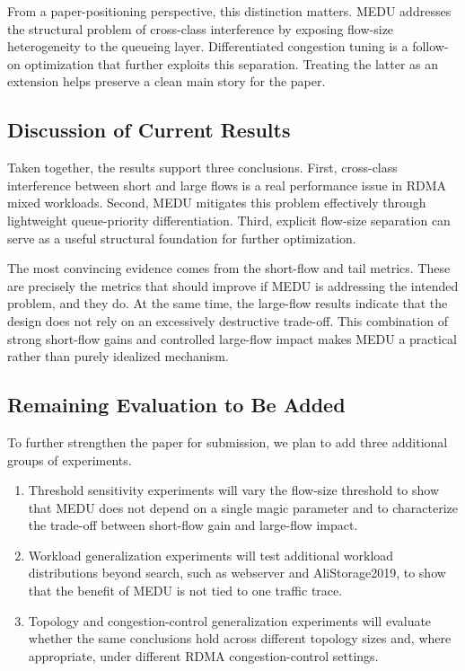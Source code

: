 \documentclass[conference]{IEEEtran}
\begin{document}
From a paper-positioning perspective, this distinction matters. MEDU addresses the structural problem of cross-class interference by exposing flow-size heterogeneity to the queueing layer. Differentiated congestion tuning is a follow-on optimization that further exploits this separation. Treating the latter as an extension helps preserve a clean main story for the paper.

\subsection{Discussion of Current Results}

Taken together, the results support three conclusions. First, cross-class interference between short and large flows is a real performance issue in RDMA mixed workloads. Second, MEDU mitigates this problem effectively through lightweight queue-priority differentiation. Third, explicit flow-size separation can serve as a useful structural foundation for further optimization.

The most convincing evidence comes from the short-flow and tail metrics. These are precisely the metrics that should improve if MEDU is addressing the intended problem, and they do. At the same time, the large-flow results indicate that the design does not rely on an excessively destructive trade-off. This combination of strong short-flow gains and controlled large-flow impact makes MEDU a practical rather than purely idealized mechanism.

\subsection{Remaining Evaluation to Be Added}

To further strengthen the paper for submission, we plan to add three additional groups of experiments.

\begin{enumerate}
  \item Threshold sensitivity experiments will vary the flow-size threshold to show that MEDU does not depend on a single magic parameter and to characterize the trade-off between short-flow gain and large-flow impact.
  \item Workload generalization experiments will test additional workload distributions beyond search, such as webserver and AliStorage2019, to show that the benefit of MEDU is not tied to one traffic trace.
  \item Topology and congestion-control generalization experiments will evaluate whether the same conclusions hold across different topology sizes and, where appropriate, under different RDMA congestion-control settings.
\end{enumerate}
\end{document}
